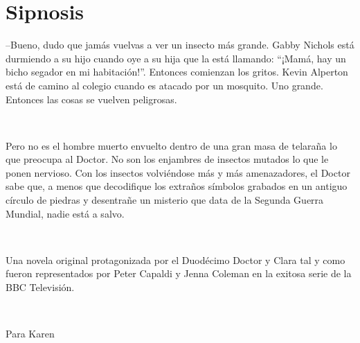 \chapter*{Sipnosis}

{--Bueno, dudo que jamás vuelvas a ver un insecto más grande.
Gabby Nichols está durmiendo a su hijo cuando oye a su hija que la está
llamando: ``¡Mamá, hay un bicho segador en mi habitación!''. Entonces
comienzan los gritos. Kevin Alperton está de camino al colegio
cuando es atacado por un mosquito. Uno grande. Entonces las cosas se
vuelven peligrosas.}

~


{Pero no es el hombre muerto envuelto dentro de una gran masa de telaraña
lo que preocupa al Doctor. No son los enjambres de insectos mutados lo
que le ponen nervioso. Con los insectos volviéndose más y más
amenazadores, el Doctor sabe que, a menos que decodifique los extraños
símbolos grabados en un antiguo círculo de piedras y desentrañe un
misterio que data de la Segunda Guerra Mundial, nadie está a
salvo.}

~

{Una novela original protagonizada por el
Duodécimo Doctor y Clara tal y como fueron representados por Peter
Capaldi y Jenna Coleman en la exitosa serie de la BBC Televisión.}

~

\newpage
{Para Karen}
